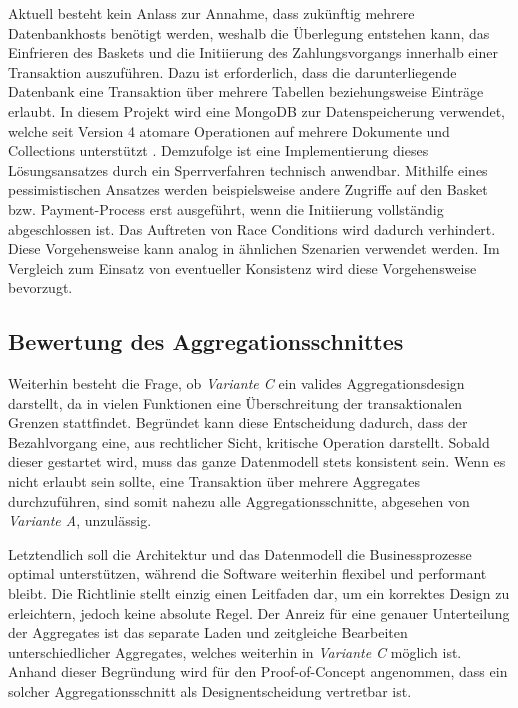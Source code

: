 Aktuell besteht kein Anlass zur Annahme, dass zukünftig mehrere Datenbankhosts benötigt werden, weshalb die Überlegung entstehen kann, das Einfrieren des Baskets und die Initiierung des Zahlungsvorgangs innerhalb einer Transaktion auszuführen. Dazu ist erforderlich, dass die darunterliegende Datenbank eine Transaktion über mehrere Tabellen beziehungsweise Einträge erlaubt. In diesem Projekt wird eine MongoDB zur Datenspeicherung verwendet, welche seit Version 4 atomare Operationen auf mehrere Dokumente und Collections unterstützt \cite{mongodb.atomicity}. Demzufolge ist eine Implementierung dieses Lösungsansatzes durch ein Sperrverfahren technisch anwendbar. Mithilfe eines pessimistischen Ansatzes werden beispielsweise andere Zugriffe auf den Basket bzw. Payment-Process erst ausgeführt, wenn die Initiierung vollständig abgeschlossen ist. Das Auftreten von Race Conditions wird dadurch verhindert. \cite{Graefe.2016} Diese Vorgehensweise kann analog in ähnlichen Szenarien verwendet werden. Im Vergleich zum Einsatz von eventueller Konsistenz wird diese Vorgehensweise bevorzugt.

\subsection{Bewertung des Aggregationsschnittes}

Weiterhin besteht die Frage, ob \emph{Variante C} ein valides Aggregationsdesign darstellt, da in vielen Funktionen eine Überschreitung der transaktionalen Grenzen stattfindet. Begründet kann diese Entscheidung dadurch, dass der Bezahlvorgang eine, aus rechtlicher Sicht, kritische Operation darstellt. Sobald dieser gestartet wird, muss das ganze Datenmodell stets konsistent sein. Wenn es nicht erlaubt sein sollte, eine Transaktion über mehrere Aggregates durchzuführen, sind somit nahezu alle Aggregationsschnitte, abgesehen von \emph{Variante A}, unzulässig. 

Letztendlich soll die Architektur und das Datenmodell die Businessprozesse optimal unterstützen, während die Software weiterhin flexibel und performant bleibt. Die Richtlinie stellt einzig einen Leitfaden dar, um ein korrektes Design zu erleichtern, jedoch keine absolute Regel. Der Anreiz für eine genauer Unterteilung der Aggregates ist das separate Laden und zeitgleiche Bearbeiten unterschiedlicher Aggregates, welches weiterhin in \emph{Variante C} möglich ist. Anhand dieser Begründung wird für den Proof-of-Concept angenommen, dass ein solcher Aggregationsschnitt als Designentscheidung vertretbar ist. 

